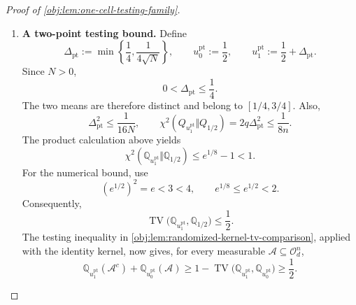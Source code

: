 \begin{proof}[Proof of \cref{obj:lem:one-cell-testing-family}]
\begin{enumerate}
To record the product calculation, define
\[
\ell_u(o):=
\begin{cases}
Q_u(\{o\})/Q_{1/2}(\{o\}),&Q_{1/2}(\{o\})>0,\\
0,&Q_{1/2}(\{o\})=0,
\end{cases}
\qquad
L_{u,n}(\boldsymbol o):=\prod_{i=1}^{n}\ell_u(o_i)
\quad(\boldsymbol o\in\mathcal O_d^n).
\]
These are likelihood ratios almost surely under the corresponding reference laws. Independence gives
\[
E_{\mathbb Q_{1/2}}L_{u,n}=1,
\qquad
E_{\mathbb Q_{1/2}}L_{u,n}^2
=
\left(E_{Q_{1/2}}\ell_u^2\right)^n.
\]
Defining the sample chi-square divergence by
\[
\chi^2(\mathbb Q_u\Vert\mathbb Q_{1/2})
:=
E_{\mathbb Q_{1/2}}(L_{u,n}-1)^2,
\]
we obtain
\[
1+\chi^2(\mathbb Q_u\Vert\mathbb Q_{1/2})
=
\left(1+\chi^2(Q_u\Vert Q_{1/2})\right)^n
\le
\exp\!\left(n\chi^2(Q_u\Vert Q_{1/2})\right).
\]
The final inequality follows from \(1+x\le e^x\) for \(x\ge0\). With the total-variation convention of
\cref{obj:lem:randomized-kernel-tv-comparison}, the finite-space formula and Cauchy--Schwarz give
\[
\operatorname{TV}(\mathbb Q_u,\mathbb Q_{1/2})
=
\frac12E_{\mathbb Q_{1/2}}|L_{u,n}-1|
\le
\frac12
\sqrt{\chi^2(\mathbb Q_u\Vert\mathbb Q_{1/2})}.
\]

\item \textbf{A two-point testing bound.}
Define
\[
\Delta_{\mathrm{pt}}
:=
\min\left\{\frac14,\frac1{4\sqrt N}\right\},
\qquad
u_0^{\mathrm{pt}}:=\frac12,
\qquad
u_1^{\mathrm{pt}}:=\frac12+\Delta_{\mathrm{pt}}.
\]
Since \(N>0\),
\[
0<\Delta_{\mathrm{pt}}\le\frac14.
\]
The two means are therefore distinct and belong to \([1/4,3/4]\). Also,
\[
\Delta_{\mathrm{pt}}^2\le\frac1{16N},
\qquad
\chi^2(Q_{u_1^{\mathrm{pt}}}\Vert Q_{1/2})
=
2q\Delta_{\mathrm{pt}}^2
\le\frac1{8n}.
\]
The product calculation above yields
\[
\chi^2(\mathbb Q_{u_1^{\mathrm{pt}}}\Vert\mathbb Q_{1/2})
\le e^{1/8}-1<1.
\]
For the numerical bound, use
\[
(e^{1/2})^2=e<3<4,
\qquad
e^{1/8}\le e^{1/2}<2.
\]
Consequently,
\[
\operatorname{TV}
 \bigl(\mathbb Q_{u_1^{\mathrm{pt}}},\mathbb Q_{1/2}\bigr)
\le\frac12.
\]
The testing inequality in
\cref{obj:lem:randomized-kernel-tv-comparison}, applied with the identity kernel, now gives, for every measurable
\(\mathscr A\subseteq\mathcal O_d^n\),
\[
\mathbb Q_{u_1^{\mathrm{pt}}}(\mathscr A^c)
+\mathbb Q_{u_0^{\mathrm{pt}}}(\mathscr A)
\ge
1-\operatorname{TV}
 \bigl(\mathbb Q_{u_1^{\mathrm{pt}}},
       \mathbb Q_{u_0^{\mathrm{pt}}}\bigr)
\ge\frac12.
\]


\end{enumerate}
\end{proof}
